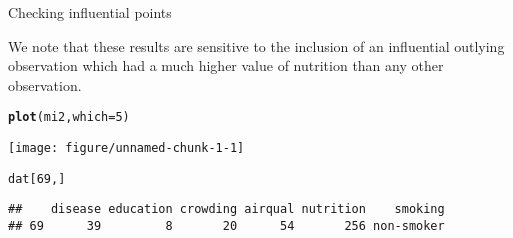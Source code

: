 \documentclass[table]{beamer}\usepackage[]{graphicx}\usepackage[]{color}
\makeatletter
\def\maxwidth{ %
  \ifdim\Gin@nat@width>\linewidth
    \linewidth
  \else
    \Gin@nat@width
  \fi
}
\newcommand{\hlnum}[1]{\textcolor[rgb]{0.686,0.059,0.569}{#1}}%
\newcommand{\hlstd}[1]{\textcolor[rgb]{0.345,0.345,0.345}{#1}}%
\newcommand{\hlkwc}[1]{\textcolor[rgb]{0.333,0.667,0.333}{#1}}%
\newcommand{\hlkwd}[1]{\textcolor[rgb]{0.737,0.353,0.396}{\textbf{#1}}}%
\newenvironment{kframe}{%
 \def\at@end@of@kframe{}%
 \ifinner\ifhmode%
  \def\at@end@of@kframe{\end{minipage}}%
  \begin{minipage}{\columnwidth}%
 \fi\fi%
 \def\FrameCommand##1{\hskip\@totalleftmargin \hskip-\fboxsep
 \colorbox{shadecolor}{##1}\hskip-\fboxsep
     \hskip-\linewidth \hskip-\@totalleftmargin \hskip\columnwidth}%
 \MakeFramed {\advance\hsize-\width
   \@totalleftmargin\z@ \linewidth\hsize
   \@setminipage}}%
 {\par\unskip\endMakeFramed%
 \at@end@of@kframe}
\newenvironment{knitrout}{}{} %
\makeatother
\begin{document}
\begin{frame}[fragile]{Checking influential points}

We note that these results are sensitive to the inclusion of an influential outlying observation which had a much higher value of nutrition than any other observation.
\begin{knitrout}\tiny
{}\color{fgcolor}\begin{kframe}
\begin{alltt}
\hlkwd{plot}\hlstd{(mi2,} \hlkwc{which}\hlstd{=}\hlnum{5}\hlstd{)}
\end{alltt}
\end{kframe}
\texttt{[image: figure/unnamed-chunk-1-1]} 
\begin{kframe}\begin{alltt}
\hlstd{dat[}\hlnum{69}\hlstd{,]}
\end{alltt}
\begin{verbatim}
##    disease education crowding airqual nutrition    smoking
## 69      39         8       20      54       256 non-smoker
\end{verbatim}
\end{kframe}
\end{knitrout}


\end{frame}

\end{document}

